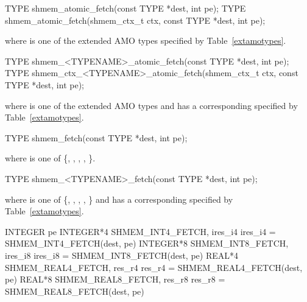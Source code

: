 
\begin{apidefinition}

\begin{C11synopsis}
TYPE shmem_atomic_fetch(const TYPE *dest, int pe);
TYPE shmem_atomic_fetch(shmem_ctx_t ctx, const TYPE *dest, int pe);
\end{C11synopsis}
where \TYPE{} is one of the extended \ac{AMO} types specified by
Table~\ref{extamotypes}.

\begin{Csynopsis}
TYPE shmem_<TYPENAME>_atomic_fetch(const TYPE *dest, int pe);
TYPE shmem_ctx_<TYPENAME>_atomic_fetch(shmem_ctx_t ctx, const TYPE *dest, int pe);
\end{Csynopsis}
where \TYPE{} is one of the extended \ac{AMO} types and has a corresponding
\TYPENAME{} specified by Table~\ref{extamotypes}.

\begin{DeprecateBlock}
\begin{C11synopsis}
TYPE shmem_fetch(const TYPE *dest, int pe);
\end{C11synopsis}
where \TYPE{} is one of \{, , ,
, \}.

\begin{Csynopsis}
TYPE shmem_<TYPENAME>_fetch(const TYPE *dest, int pe);
\end{Csynopsis}
where \TYPE{} is one of \{, , ,
, \} and has a corresponding
\TYPENAME{} specified by Table~\ref{extamotypes}.
\end{DeprecateBlock}

\begin{Fsynopsis}
INTEGER pe
INTEGER*4 SHMEM_INT4_FETCH, ires_i4
ires_i4 = SHMEM_INT4_FETCH(dest, pe)
INTEGER*8 SHMEM_INT8_FETCH, ires_i8
ires_i8 = SHMEM_INT8_FETCH(dest, pe)
REAL*4 SHMEM_REAL4_FETCH, res_r4
res_r4 = SHMEM_REAL4_FETCH(dest, pe)
REAL*8 SHMEM_REAL8_FETCH, res_r8
res_r8 = SHMEM_REAL8_FETCH(dest, pe)
\end{Fsynopsis}

\begin{apiarguments}



\end{apiarguments}
\end{apidefinition}
